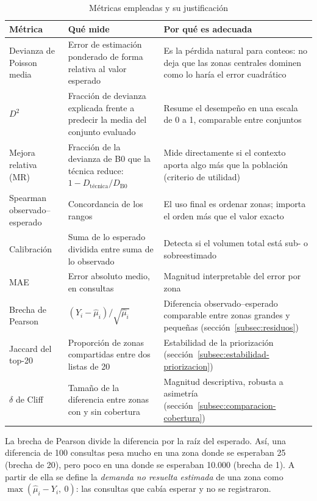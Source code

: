 \begin{table}[H]
  \centering
  \caption{Métricas empleadas y su justificación}
  \label{tab:metricas-uso}
  \interlineadoSimple
  \small
  \begin{tabularx}{\textwidth}{@{}L{0.26\textwidth}L{0.30\textwidth}Y@{}}
    \toprule
    \textbf{Métrica} & \textbf{Qué mide} & \textbf{Por qué es adecuada} \\
    \midrule
    Devianza de Poisson media & Error de estimación ponderado de forma relativa al valor esperado & Es la pérdida natural para conteos: no deja que las zonas centrales dominen como lo haría el error cuadrático \\
    $D^2$ & Fracción de devianza explicada frente a predecir la media del conjunto evaluado & Resume el desempeño en una escala de 0 a 1, comparable entre conjuntos \\
    Mejora relativa (MR) & Fracción de la devianza de B0 que la técnica reduce: $1 - D_{\mathrm{técnica}}/D_{\mathrm{B0}}$ & Mide directamente si el contexto aporta algo más que la población (criterio de utilidad) \\
    Spearman observado--esperado & Concordancia de los rangos & El uso final es ordenar zonas; importa el orden más que el valor exacto \\
    Calibración & Suma de lo esperado dividida entre suma de lo observado & Detecta si el volumen total está sub- o sobreestimado \\
    MAE & Error absoluto medio, en consultas & Magnitud interpretable del error por zona \\
    Brecha de Pearson & $(Y_i - \hat{\mu}_i)/\sqrt{\hat{\mu}_i}$ & Diferencia observado--esperado comparable entre zonas grandes y pequeñas (sección~\ref{subsec:residuos}) \\
    Jaccard del top-20 & Proporción de zonas compartidas entre dos listas de 20 & Estabilidad de la priorización (sección~\ref{subsec:estabilidad-priorizacion}) \\
    $\delta$ de Cliff & Tamaño de la diferencia entre zonas con y sin cobertura & Magnitud descriptiva, robusta a asimetría (sección~\ref{subsec:comparacion-cobertura}) \\
    \bottomrule
  \end{tabularx}
\end{table}

La brecha de Pearson divide la diferencia por la raíz del esperado. Así, una diferencia de
100 consultas pesa mucho en una zona donde se esperaban 25 (brecha de 20), pero poco en
una donde se esperaban 10.000 (brecha de 1). A partir de ella se define la \emph{demanda no
resuelta estimada} de una zona como $\max(\hat{\mu}_i - Y_i,\ 0)$: las consultas que cabía
esperar y no se registraron.

